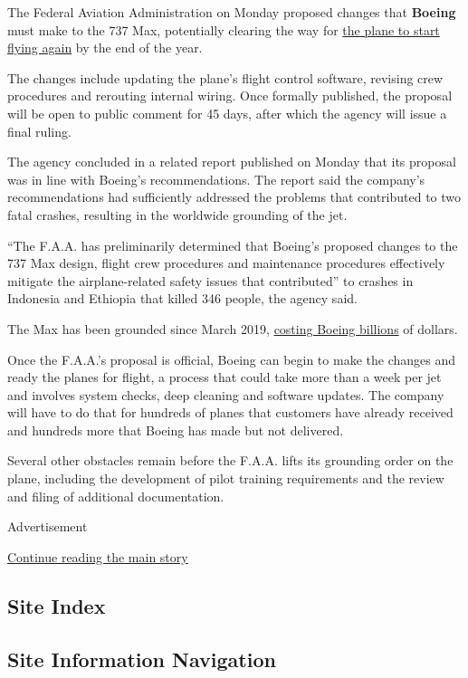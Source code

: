 The Federal Aviation Administration on Monday proposed changes that
\textbf{Boeing} must make to the 737 Max, potentially clearing the way
for
\href{https://www.nytimes.com/2020/07/15/business/boeing-737-max-return.html}{the
plane to start flying again} by the end of the year.

The changes include updating the plane's flight control software,
revising crew procedures and rerouting internal wiring. Once formally
published, the proposal will be open to public comment for 45 days,
after which the agency will issue a final ruling.

The agency concluded in a related report published on Monday that its
proposal was in line with Boeing's recommendations. The report said the
company's recommendations had sufficiently addressed the problems that
contributed to two fatal crashes, resulting in the worldwide grounding
of the jet.

``The F.A.A. has preliminarily determined that Boeing's proposed changes
to the 737 Max design, flight crew procedures and maintenance procedures
effectively mitigate the airplane-related safety issues that
contributed'' to crashes in Indonesia and Ethiopia that killed 346
people, the agency said.

The Max has been grounded since March 2019,
\href{https://www.nytimes.com/2020/01/29/business/boeing-737-max-costs.html}{costing
Boeing billions} of dollars.

Once the F.A.A.'s proposal is official, Boeing can begin to make the
changes and ready the planes for flight, a process that could take more
than a week per jet and involves system checks, deep cleaning and
software updates. The company will have to do that for hundreds of
planes that customers have already received and hundreds more that
Boeing has made but not delivered.

Several other obstacles remain before the F.A.A. lifts its grounding
order on the plane, including the development of pilot training
requirements and the review and filing of additional documentation.

Advertisement

\protect\hyperlink{after-bottom}{Continue reading the main story}

\hypertarget{site-index}{%
\subsection{Site Index}\label{site-index}}

\hypertarget{site-information-navigation}{%
\subsection{Site Information
Navigation}\label{site-information-navigation}}

